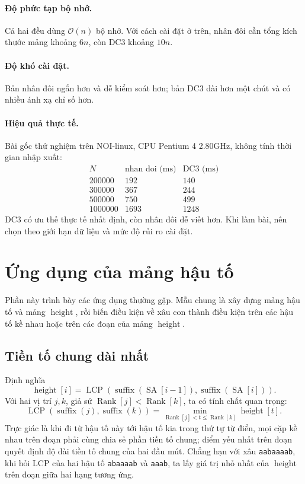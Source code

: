 \documentclass[11pt]{article}
\newcommand{\Oh}{\mathcal{O}}
\newcommand{\SA}{\operatorname{SA}}
\newcommand{\Rank}{\operatorname{Rank}}
\newcommand{\Height}{\operatorname{height}}
\newcommand{\Suffix}{\operatorname{suffix}}
\newcommand{\LCP}{\operatorname{LCP}}
\begin{document}
\paragraph{Độ phức tạp bộ nhớ.}
Cả hai đều dùng \(\Oh(n)\) bộ nhớ. Với cách cài đặt ở trên, nhân đôi cần tổng
kích thước mảng khoảng \(6n\), còn DC3 khoảng \(10n\).

\paragraph{Độ khó cài đặt.}
Bản nhân đôi ngắn hơn và dễ kiểm soát hơn; bản DC3 dài hơn một chút và có
nhiều ánh xạ chỉ số hơn.

\paragraph{Hiệu quả thực tế.}
Bài gốc thử nghiệm trên NOI-linux, CPU Pentium 4 2.80GHz, không tính thời
gian nhập xuất:
\[
\begin{array}{r|r|r}
N & \text{nhan doi (ms)} & \text{DC3 (ms)}\\
\hline
200000 & 192 & 140\\
300000 & 367 & 244\\
500000 & 750 & 499\\
1000000 & 1693 & 1248
\end{array}
\]
DC3 có ưu thế thực tế nhất định, còn nhân đôi dễ viết hơn. Khi làm bài, nên
chọn theo giới hạn dữ liệu và mức độ rủi ro cài đặt.

\section{Ứng dụng của mảng hậu tố}

Phần này trình bày các ứng dụng thường gặp. Mẫu chung là xây dựng mảng hậu tố
và mảng \(\Height\), rồi biến điều kiện về xâu con thành điều kiện trên các
hậu tố kề nhau hoặc trên các đoạn của mảng \(\Height\).

\subsection{Tiền tố chung dài nhất}

Định nghĩa
\[
  \Height[i] = \LCP(\Suffix(\SA[i-1]),\Suffix(\SA[i])).
\]
Với hai vị trí \(j,k\), giả sử \(\Rank[j]<\Rank[k]\), ta có tính chất quan
trọng:
\[
  \LCP(\Suffix(j),\Suffix(k))
  = \min_{\Rank[j] < t \le \Rank[k]} \Height[t].
\]
Trực giác là khi đi từ hậu tố này tới hậu tố kia trong thứ tự từ điển, mọi
cặp kề nhau trên đoạn phải cùng chia sẻ phần tiền tố chung; điểm yếu nhất
trên đoạn quyết định độ dài tiền tố chung của hai đầu mút. Chẳng hạn với xâu
\texttt{aabaaaab}, khi hỏi LCP của hai hậu tố \texttt{abaaaab} và
\texttt{aaab}, ta lấy giá trị nhỏ nhất của \(\Height\) trên đoạn giữa hai
hạng tương ứng.
\end{document}

